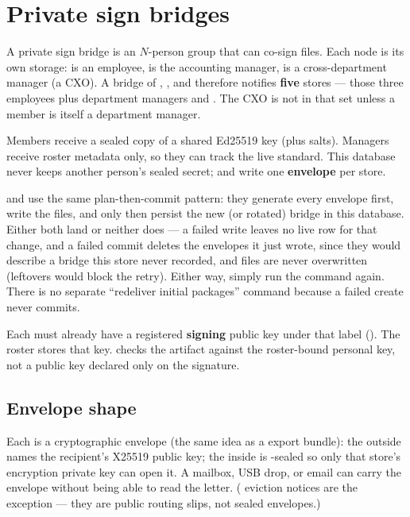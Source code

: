 \section{Private sign bridges}
\label{sec:private-bridges}

A private sign bridge is an $N$-person group that can co-sign files. Each
node is its own storage:  is an employee,  is the
accounting manager,  is a cross-department manager (a CXO). A
bridge of , , and  therefore notifies
\textbf{five} stores --- those three employees plus department managers
 and . The CXO is not in that set unless a member is
itself a department manager.

Members receive a sealed copy of a shared Ed25519 key (plus salts).
Managers receive roster metadata only, so they can track the live standard.
This database never keeps another person's sealed secret;  and
 write one  \textbf{envelope} per store.

\begin{noteBox}
 and  use the same plan-then-commit
pattern: they generate every envelope first, write the files, and only then
persist the new (or rotated) bridge in this database. Either both land or
neither does --- a failed write leaves no live row for that change, and a
failed commit deletes the envelopes it just wrote, since they would
describe a bridge this store never recorded, and  files are
never overwritten (leftovers would block the retry). Either way, simply run
the command again. There is no separate ``redeliver initial packages''
command because a failed create never commits.
\end{noteBox}

Each  must already have a registered \textbf{signing} public
key under that label (). The roster stores that key.  checks the artifact
against the roster-bound personal key, not a public key declared only on
the signature.

\subsection{Envelope shape}

Each  is a cryptographic envelope (the same idea as a
 export bundle): the outside names the recipient's X25519 public
key; the inside is -sealed so only that store's
encryption private key can open it. A mailbox, USB drop, or email can carry
the envelope without being able to read the letter. ( eviction
notices are the exception --- they are public routing slips, not sealed
envelopes.)

